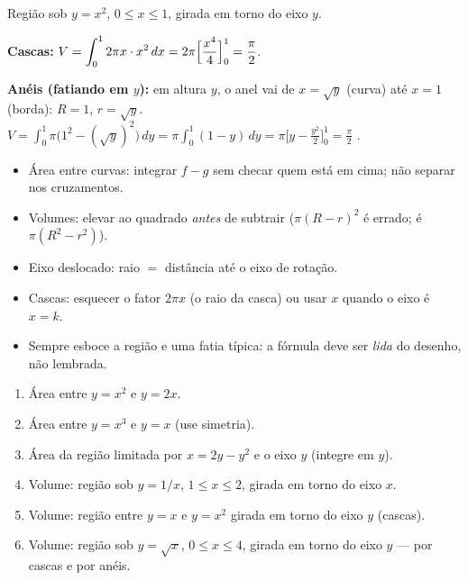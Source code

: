 \begin{exemplo}
Região sob $y=x^2$, $0\le x\le1$, girada em torno do eixo $y$.

\textbf{Cascas:} $V=\displaystyle\int_0^1 2\pi x\cdot x^2\,dx=2\pi\Big[\frac{x^4}{4}\Big]_0^1=\frac{\pi}{2}$.

\textbf{Anéis (fatiando em $y$):} em altura $y$, o anel vai de $x=\sqrt y$ (curva) até $x=1$ (borda): $R=1$, $r=\sqrt y$.
$V=\displaystyle\int_0^1\pi\big(1^2-(\sqrt y)^2\big)\,dy=\pi\int_0^1(1-y)\,dy=\pi\Big[y-\frac{y^2}{2}\Big]_0^1=\frac{\pi}{2}$ \ok.
\end{exemplo}

\begin{armadilha}[{Capítulo 6}]
\begin{itemize}[leftmargin=1.4em, itemsep=1pt]
\item Área entre curvas: integrar $f-g$ sem checar quem está em cima; não separar nos cruzamentos.
\item Volumes: elevar ao quadrado \emph{antes} de subtrair ($\pi(R-r)^2$ é errado; é $\pi(R^2-r^2)$).
\item Eixo deslocado: raio $=$ distância até o eixo de rotação.
\item Cascas: esquecer o fator $2\pi x$ (o raio da casca) ou usar $x$ quando o eixo é $x=k$.
\item Sempre esboce a região e uma fatia típica: a fórmula deve ser \emph{lida} do desenho, não lembrada.
\end{itemize}
\end{armadilha}

\begin{exercicios}
\begin{enumerate}[leftmargin=1.6em, itemsep=2pt, label=\textbf{6.\arabic*}]
\item Área entre $y=x^2$ e $y=2x$.
\item Área entre $y=x^3$ e $y=x$ (use simetria).
\item Área da região limitada por $x=2y-y^2$ e o eixo $y$ (integre em $y$).
\item Volume: região sob $y=1/x$, $1\le x\le2$, girada em torno do eixo $x$.
\item Volume: região entre $y=x$ e $y=x^2$ girada em torno do eixo $y$ (cascas).
\item Volume: região sob $y=\sqrt x$, $0\le x\le4$, girada em torno do eixo $y$ --- por cascas e por anéis.
\end{enumerate}
\end{exercicios}
